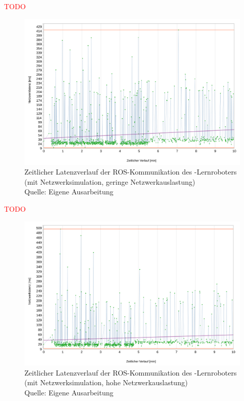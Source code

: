 \textcolor{red}{TODO}

\begin{figure}[htb]
	\centering
	\includegraphics[width=1.04\textwidth]{images/ergebnisse/ROS_App_und_mit_Netzwerksimulation}
	\caption[Zeitlicher Latenzverlauf der ROS-Kommunikation des -Lernroboters (mit Netzwerksimulation, geringe Netzwerkauslastung)]{Zeitlicher Latenzverlauf der ROS-Kommunikation des -Lernroboters (mit Netzwerksimulation, geringe Netzwerkauslastung)\\Quelle: Eigene Ausarbeitung}
	\label{fig:measurement_robot_ros_with_network_simulation_low_network_traffic}
\end{figure}
\FloatBarrier

\textcolor{red}{TODO}

\begin{figure}[htb]
	\centering
	\includegraphics[width=1.04\textwidth]{images/ergebnisse/ROS_App_mit_Netzwerksimulation_und_hohe_Auslastung}
	\caption[Zeitlicher Latenzverlauf der ROS-Kommunikation des -Lernroboters (mit Netzwerksimulation, hohe Netzwerkauslastung)]{Zeitlicher Latenzverlauf der ROS-Kommunikation des -Lernroboters (mit Netzwerksimulation, hohe Netzwerkauslastung)\\Quelle: Eigene Ausarbeitung}
	\label{fig:measurement_robot_ros_with_network_simulation_high_network_traffic}
\end{figure}
\FloatBarrier

